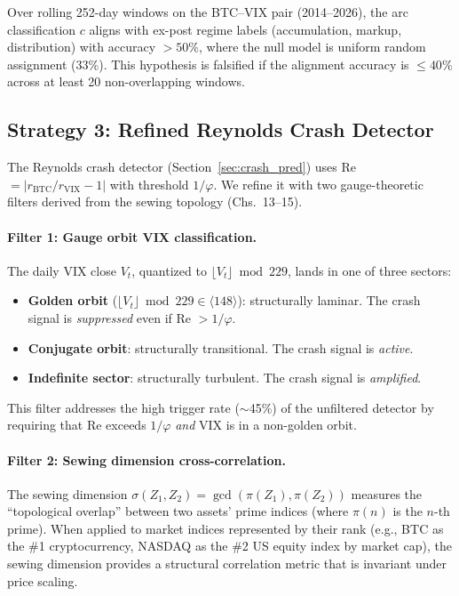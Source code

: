 \begin{hypothesis}\label{hyp:halt_time}
Over rolling 252-day windows on the BTC--VIX pair (2014--2026), the arc classification $c$ aligns with ex-post regime labels (accumulation, markup, distribution) with accuracy $> 50\%$, where the null model is uniform random assignment ($33\%$). This hypothesis is falsified if the alignment accuracy is $\leq 40\%$ across at least 20 non-overlapping windows.
\end{hypothesis}

\subsection{Strategy 3: Refined Reynolds Crash Detector}

The Reynolds crash detector (Section~\ref{sec:crash_pred}) uses Re $= |r_{\text{BTC}}/r_{\text{VIX}} - 1|$ with threshold $1/\varphi$. We refine it with two gauge-theoretic filters derived from the sewing topology (Chs.~13--15).

\paragraph{Filter 1: Gauge orbit VIX classification.}
The daily VIX close $V_t$, quantized to $\lfloor V_t \rfloor \bmod 229$, lands in one of three sectors:
\begin{itemize}[noitemsep]
    \item \textbf{Golden orbit} ($\lfloor V_t \rfloor \bmod 229 \in \langle 148 \rangle$): structurally laminar. The crash signal is \emph{suppressed} even if Re $> 1/\varphi$.
    \item \textbf{Conjugate orbit}: structurally transitional. The crash signal is \emph{active}.
    \item \textbf{Indefinite sector}: structurally turbulent. The crash signal is \emph{amplified}.
\end{itemize}
This filter addresses the high trigger rate ($\sim$45\%) of the unfiltered detector by requiring that Re exceeds $1/\varphi$ \emph{and} VIX is in a non-golden orbit.

\paragraph{Filter 2: Sewing dimension cross-correlation.}
The sewing dimension $\sigma(Z_1, Z_2) = \gcd(\pi(Z_1), \pi(Z_2))$ measures the ``topological overlap'' between two assets' prime indices (where $\pi(n)$ is the $n$-th prime). When applied to market indices represented by their rank (e.g., BTC as the \#1 cryptocurrency, NASDAQ as the \#2 US equity index by market cap), the sewing dimension provides a structural correlation metric that is invariant under price scaling.

